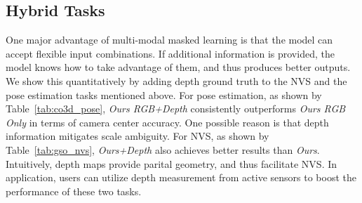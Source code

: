 \subsection{Hybrid Tasks}\label{sec:exp-hybrid}
One major advantage of multi-modal masked learning is that the model can accept flexible input combinations. If additional information is provided, the model knows how to take advantage of them, and thus produces better outputs. We show this quantitatively by adding depth ground truth to the NVS and the pose estimation tasks mentioned above. For pose estimation, as shown by Table~\ref{tab:co3d_pose}, \textit{Ours RGB+Depth} consistently outperforms \textit{Ours RGB Only} in terms of camera center accuracy. One possible reason is that depth information mitigates scale ambiguity. For NVS, as shown by Table~\ref{tab:gso_nvs}, \textit{Ours+Depth} also achieves better results than \textit{Ours}. Intuitively, depth maps provide parital geometry, and thus facilitate NVS. In application, users can utilize depth measurement from active sensors to boost the performance of these two tasks. 






